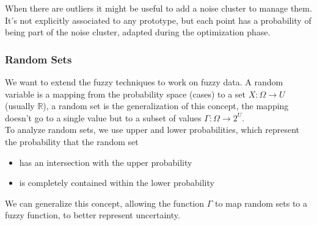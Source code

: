 When there are outliers it might be useful to add a noise cluster to manage them. It's not explicitly associated to any prototype, but each point has a probability of being part of the noise cluster, adapted during the optimization phase.\\

\subsubsection{Random Sets}
We want to extend the fuzzy techniques to work on fuzzy data. A random variable is a mapping from the probability space (cases) to a set $X: \Omega \rightarrow U$ (usually $\mathbb{R}$), a random set is the generalization of this concept, the mapping doesn't go to a single value but to a subset of values $\Gamma: \Omega \rightarrow 2^U$. \\

To analyze random sets, we use upper and lower probabilities, which represent the probability that the random set
\begin{itemize}
	\item has an intersection with the upper probability
	\item is completely contained within the lower probability
\end{itemize}

We can generalize this concept, allowing the function $\Gamma$ to map random sets to a fuzzy function, to better represent uncertainty.\\


